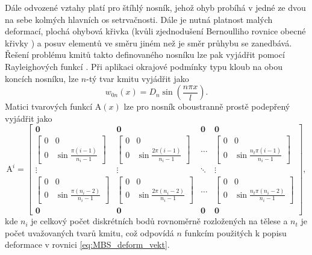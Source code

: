 Dále odvozené vztahy platí pro štíhlý nosník, jehož ohyb probíhá v jedné ze dvou na sebe kolmých hlavních os setrvačnosti. Dále je nutná platnost malých deformací, plochá ohybová křivka (kvůli zjednodušení Bernoulliho rovnice obecné křivky \cite{cite:PPI}) a posuv elementů ve směru jiném než je směr průhybu se zanedbává. Řešení problému kmitů takto definovaného nosníku lze pak vyjádřit pomocí Rayleighových funkcí \cite{cite:Vlny}. Při aplikaci okrajové podmínky typu kloub na obou koncích nosníku, lze $ n $-tý tvar kmitu vyjádřit jako
\begin{equation}\label{eq:MBS_kmity}
	w_{0n}(x) = D_n \sin \left( \frac{n \pi x}{l} \right) .
\end{equation}
Matici tvarových funkcí $ \mathrm{A}(x) $ lze pro nosník oboustranně prostě podepřený vyjádřit jako
\begin{equation}\label{eq:MBS_matA}
	\mathrm{A}^{i} =
	\begin{bmatrix}
		\mathbf{0} & \mathbf{0} & \mathbf{0}  & \mathbf{0} \\ 
		\begin{bmatrix}
			0 & 0 \\ 
			0 & \sin\frac{\pi (i-1)}{n_i -1}
		\end{bmatrix}  & \begin{bmatrix}
			0 & 0 \\ 
			0 & \sin\frac{2 \pi (i-1)}{n_i -1}
		\end{bmatrix} & \dots & \begin{bmatrix}
			0 & 0 \\ 
			0 & \sin\frac{n_t \pi (i-1)}{n_i -1}
		\end{bmatrix} \\ 
		\vdots& \vdots & \ddots & \vdots \\ 
		\begin{bmatrix}
			0 & 0 \\ 
			0 & \sin\frac{\pi (n_i-2)}{n_i -1}
		\end{bmatrix}& \begin{bmatrix}
			0 & 0 \\ 
			0 & \sin\frac{2\pi (n_i-2)}{n_i -1}
		\end{bmatrix} & \dots & \begin{bmatrix}
			0 & 0 \\ 
			0 & \sin\frac{n_t\pi (n_i-2)}{n_i -1}
		\end{bmatrix} \\
		\mathbf{0} & \mathbf{0} & \mathbf{0}  & \mathbf{0} 
	\end{bmatrix} ,
\end{equation}
kde $ n_i $ je celkový počet diskrétních bodů rovnoměrně rozložených na tělese a $ n_t $ je počet uvažovaných tvarů kmitu, což odpovídá $ n $ funkcím použitých k popisu deformace v rovnici \ref{eq:MBS_deform_vekt}.


